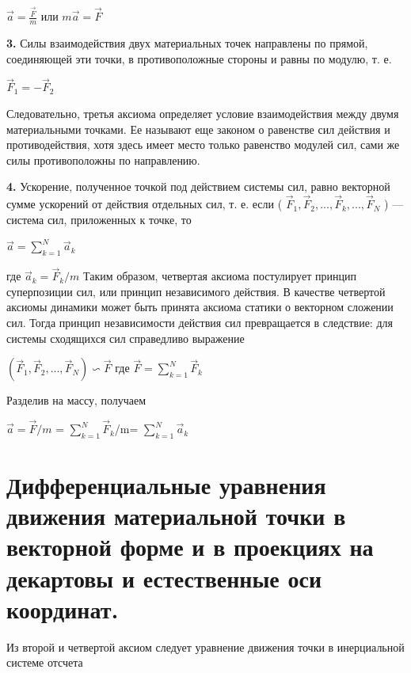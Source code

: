 {\begin{center}
   \par $ \vec{a}=\frac{\vec{F}}{m} $ или $ m\vec{a}=\vec{F}$
   
   \par \textbf{3.} Силы взаимодействия двух  материальных  точек направлены по прямой, соединяющей эти точки, в противоположные стороны и равны по модулю, т. е. 
   
   \par $ \vec{F}_{1}=-\vec{F}_{2} $
   
   \par Следовательно, третья аксиома определяет условие взаимодействия между двумя материальными точками. Ее называют еще законом о равенстве сил действия и противодействия, хотя здесь имеет место только равенство модулей сил, сами же силы противоположны по направлению.

   \par \textbf{4.} Ускорение, полученное точкой под действием системы сил, равно векторной сумме  ускорений  от  действия  отдельных  сил,  т.  е.  если ( $\vec{F}_{1}, \vec{F}_{2},..., \vec{F}_{k},..., \vec{F}_{N} $ )  —  система сил, приложенных к точке, то 
   
   \par $\vec{a}=\sum_{k=1}^{N}\vec{a}_{k}$
   
   \par где $\vec{a}_{k}=\vec{F}_{k}/m$
   Таким образом, четвертая аксиома постулирует принцип суперпозиции сил, или принцип независимого действия. В качестве четвертой аксиомы динамики может быть принята аксиома статики о векторном сложении сил. Тогда принцип независимости действия сил превращается в следствие: для системы сходящихся сил справедливо выражение
   
   \par $(\vec{F}_{1}, \vec{F}_{2},...,\vec{F}_{N} ) \backsim \vec{F}$ где $\vec{F}=\sum_{k=1}^{N}\vec{F}_{k}$

   \par Разделив на массу, получаем
   \par $\vec{a}=\vec{F}/m$ = $\sum_{k=1}^{N}\vec{F}_{k}$/m= $\sum_{k=1}^{N}\vec{a}_{k}$
\end{center}
\section{Дифференциальные уравнения движения материальной точки в векторной форме и в проекциях на декартовы и естественные оси координат.}
\begin{center}
    \par Из второй и четвертой аксиом следует уравнение движения точки в инерциальной системе отсчета 
    

\end{center}}
